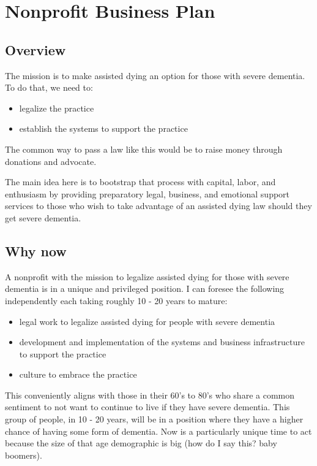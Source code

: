 \documentclass{proposalnsf}
\begin{document}
    

        
        
\section{Nonprofit Business Plan}
\subsection{Overview}
The mission is to make assisted dying an option for those with severe dementia. To do that, we need to:
      \begin{itemize}
          \item{legalize the practice}
          \item{establish the systems to support the practice}
      \end{itemize}

The common way to pass a law like this would be to raise money through donations and advocate.

The main idea here is to bootstrap that process with capital, labor, and enthusiasm by providing preparatory legal, business, and emotional support services to those who wish to take advantage of an assisted dying law should they get severe dementia.

\subsection{Why now}
A nonprofit with the mission to legalize assisted dying for those with severe dementia is in a unique and privileged position. I can foresee the following independently each taking roughly 10 - 20 years to mature:

      \begin{itemize}
          \item{legal work to legalize assisted dying for people with severe dementia}
          \item{development and implementation of the systems and business infrastructure to support the practice}
          \item{culture to embrace the practice}
      \end{itemize}


This conveniently aligns with those in their 60's to 80's who share a common sentiment to not want to continue to live if they have severe dementia. This group of people, in 10 - 20 years, will be in a position where they have a higher chance of having some form of dementia. Now is a particularly unique time to act because the size of that age demographic is big (how do I say this? baby boomers).
\end{document}
